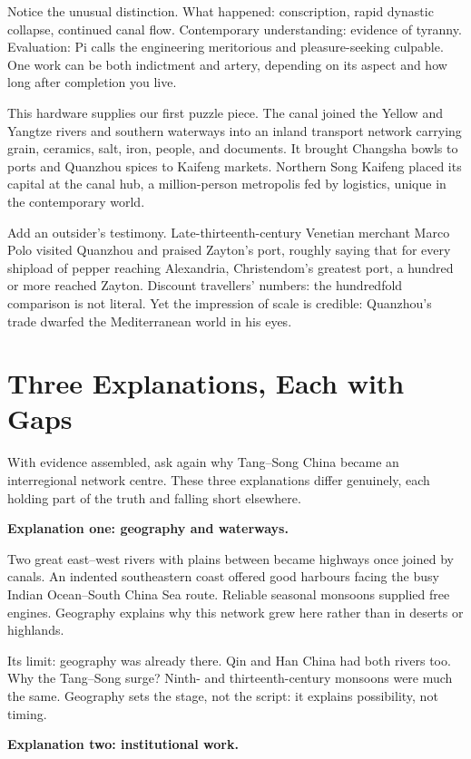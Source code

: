 Notice the unusual distinction. What happened: conscription, rapid dynastic collapse, continued canal flow. Contemporary understanding: evidence of tyranny. Evaluation: Pi calls the engineering meritorious and pleasure-seeking culpable. One work can be both indictment and artery, depending on its aspect and how long after completion you live.

This hardware supplies our first puzzle piece. The canal joined the Yellow and Yangtze rivers and southern waterways into an inland transport network carrying grain, ceramics, salt, iron, people, and documents. It brought Changsha bowls to ports and Quanzhou spices to Kaifeng markets. Northern Song Kaifeng placed its capital at the canal hub, a million-person metropolis fed by logistics, unique in the contemporary world.

Add an outsider's testimony. Late-thirteenth-century Venetian merchant Marco Polo visited Quanzhou and praised Zayton's port, roughly saying that for every shipload of pepper reaching Alexandria, Christendom's greatest port, a hundred or more reached Zayton. Discount travellers' numbers: the hundredfold comparison is not literal. Yet the impression of scale is credible: Quanzhou's trade dwarfed the Mediterranean world in his eyes.

\section{Three Explanations, Each with Gaps}
With evidence assembled, ask again why Tang--Song China became an interregional network centre. These three explanations differ genuinely, each holding part of the truth and falling short elsewhere.

\textbf{Explanation one: geography and waterways.}

Two great east--west rivers with plains between became highways once joined by canals. An indented southeastern coast offered good harbours facing the busy Indian Ocean--South China Sea route. Reliable seasonal monsoons supplied free engines. Geography explains why this network grew here rather than in deserts or highlands.

Its limit: geography was already there. Qin and Han China had both rivers too. Why the Tang--Song surge? Ninth- and thirteenth-century monsoons were much the same. Geography sets the stage, not the script: it explains possibility, not timing.

\textbf{Explanation two: institutional work.}

